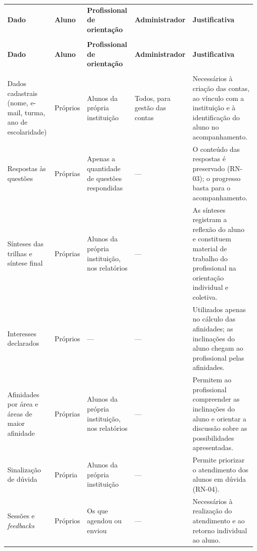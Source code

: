 {\ABNTEXfontereduzida
\renewcommand{\arraystretch}{1.25}
\begin{xltabular}{\textwidth}{|>{\raggedright\arraybackslash}p{2.7cm}|>{\raggedright\arraybackslash}p{1.6cm}|>{\raggedright\arraybackslash}p{2.6cm}|>{\raggedright\arraybackslash}p{2.4cm}|>{\raggedright\arraybackslash}X|}
 \\[0.3em]
\hline
\textbf{Dado} & \textbf{Aluno} & \textbf{Profissional de orientação} & \textbf{Administrador} & \textbf{Justificativa} \\
\hline
\endfirsthead
{} \\
\hline
\textbf{Dado} & \textbf{Aluno} & \textbf{Profissional de orientação} & \textbf{Administrador} & \textbf{Justificativa} \\
\hline
\endhead
{} \\
\endfoot
\endlastfoot
Dados cadastrais (nome, e-mail, turma, ano de escolaridade) & Próprios & Alunos da própria instituição & Todos, para gestão das contas & Necessários à criação das contas, ao vínculo com a instituição e à identificação do aluno no acompanhamento. \\
\hline
Respostas às questões & Próprias & Apenas a quantidade de questões respondidas & — & O conteúdo das respostas é preservado (RN-03); o progresso basta para o acompanhamento. \\
\hline
Sínteses das trilhas e síntese final & Próprias & Alunos da própria instituição, nos relatórios & — & As sínteses registram a reflexão do aluno e constituem material de trabalho do profissional na orientação individual e coletiva. \\
\hline
Interesses declarados & Próprios & — & — & Utilizados apenas no cálculo das afinidades; as inclinações do aluno chegam ao profissional pelas afinidades. \\
\hline
Afinidades por área e áreas de maior afinidade & Próprias & Alunos da própria instituição, nos relatórios & — & Permitem ao profissional compreender as inclinações do aluno e orientar a discussão sobre as possibilidades apresentadas. \\
\hline
Sinalização de dúvida & Própria & Alunos da própria instituição & — & Permite priorizar o atendimento dos alunos em dúvida (RN-04). \\
\hline
Sessões e \textit{feedbacks} & Próprios & Os que agendou ou enviou & — & Necessários à realização do atendimento e ao retorno individual ao aluno. \\
\hline
\end{xltabular}
}

